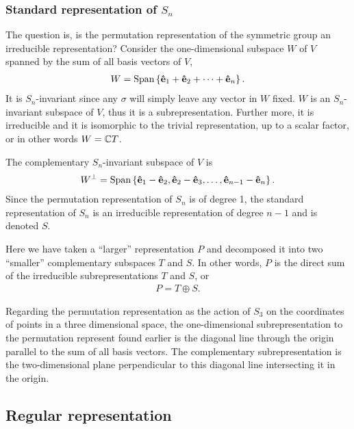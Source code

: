 \subsubsection{Standard representation of $S_n$}\label{sect:standSn}

	The question is, is the permutation representation of the symmetric group an irreducible representation? Consider the one-dimensional subspace $W$ of $V$ spanned by the sum of all basis vectors of $V$,
	\begin{align}
		W = \text{Span}\left\lbrace \mathbf{\hat{e}}_1 + \mathbf{\hat{e}}_2 + \dots + \mathbf{\hat{e}}_n \right\rbrace.
	\end{align}
	It is $S_n$-invariant since any $\sigma$ will simply leave any vector in $W$ fixed. $W$ is an $S_n$-invariant subspace of $V$, thus it is a subrepresentation. Further more, it is irreducible and it is isomorphic to the trivial representation, up to a scalar factor, or in other words $W = \mathbb{C} T$.
	
	The complementary $S_n$-invariant subspace of $V$ is 
	\begin{align}
		W^\perp = \text{Span}\left\lbrace \mathbf{\hat{e}}_1 - \mathbf{\hat{e}}_2, \mathbf{\hat{e}}_2 - \mathbf{\hat{e}}_3, \dots, \mathbf{\hat{e}}_{n-1} - \mathbf{\hat{e}}_n \right\rbrace.
	\end{align}
	Since the permutation representation of $S_n$ is of degree 1, the standard representation of $S_n$ is an irreducible representation of degree $n-1$ and is denoted $S$. 
	
	Here we have taken a ``larger'' representation $P$ and decomposed it into two ``smaller'' complementary subspaces $T$ and $S$. In other words, $P$ is the direct sum of the irreducible subrepresentations $T$ and $S$, or
	\begin{align}
		P = T \oplus S.
	\end{align}
	
	\begin{example}\label{ex:standS3}
		Regarding the permutation representation as the action of $S_3$ on the coordinates of points in a three dimensional space, the one-dimensional subrepresentation to the permutation represent found earlier is the diagonal line through the origin parallel to the sum of all basis vectors. The complementary subrepresentation is the two-dimensional plane perpendicular to this diagonal line intersecting it in the origin.
		
	\end{example}

\subsection{Regular representation}

